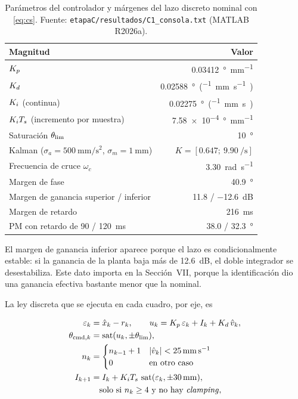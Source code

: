 \begin{table}[!t]
\caption{Parámetros del controlador y márgenes del lazo discreto nominal con \eqref{eq:cs}. Fuente:
\texttt{etapaC/resultados/C1\_consola.txt} (MATLAB R2026a).}
\label{tab:controlador}
\centering
\footnotesize
\begin{tabular}{@{}lr@{}}
\toprule
\textbf{Magnitud} & \textbf{Valor} \\
\midrule
$K_p$ & \SI{0.03412}{\degree\per\milli\metre} \\
$K_d$ & \SI{0.02588}{\degree\per(\milli\metre\per\second)} \\
$K_i$ (continua) & \SI{0.02275}{\degree\per(\milli\metre\second)} \\
$K_iT_s$ (incremento por muestra) & \SI{7.58e-4}{\degree\per\milli\metre} \\
Saturación $\theta_{\mathrm{lim}}$ & \SI{10}{\degree} \\
Kalman ($\sigma_a = \SI{500}{\milli\metre\per\second\squared}$, $\sigma_m = \SI{1}{\milli\metre}$) & $K = [\num{0.647};\ \SI{9.90}{\per\second}]$ \\
\midrule
Frecuencia de cruce $\omega_c$ & \SI{3.30}{\radian\per\second} \\
Margen de fase & \SI{40.9}{\degree} \\
Margen de ganancia superior / inferior & \SI{+11.8}{} / \SI{-12.6}{\deci\bel} \\
Margen de retardo & \SI{216}{\milli\second} \\
PM con retardo de 90 / \SI{120}{\milli\second} & \SI{38.0}{} / \SI{32.3}{\degree} \\
\bottomrule
\end{tabular}
\end{table}

El margen de ganancia inferior aparece porque el lazo es condicionalmente estable: si la ganancia
de la planta baja más de \SI{12.6}{\deci\bel}, el doble integrador se desestabiliza. Este dato
importa en la Sección~VII, porque la identificación dio una ganancia efectiva bastante menor que
la nominal.

La ley discreta que se ejecuta en cada cuadro, por eje, es

\begin{equation}
\begin{aligned}
\varepsilon_k &= \hat{x}_k - r_k, \qquad u_k = K_p\,\varepsilon_k + I_k + K_d\,\hat{v}_k,\\
\theta_{\mathrm{cmd},k} &= \operatorname{sat}(u_k, \pm\theta_{\mathrm{lim}}),\\
n_k &= \begin{cases} n_{k-1} + 1 & |\hat{v}_k| < \SI{25}{\milli\metre\per\second}\\ 0 & \text{en otro caso}\end{cases}\\
I_{k+1} &= I_k + K_iT_s\,\operatorname{sat}(\varepsilon_k, \pm\SI{30}{\milli\metre}),\\
&\quad\text{solo si } n_k \ge 4 \text{ y no hay \emph{clamping}},
\end{aligned}
\label{eq:ley}
\end{equation}

